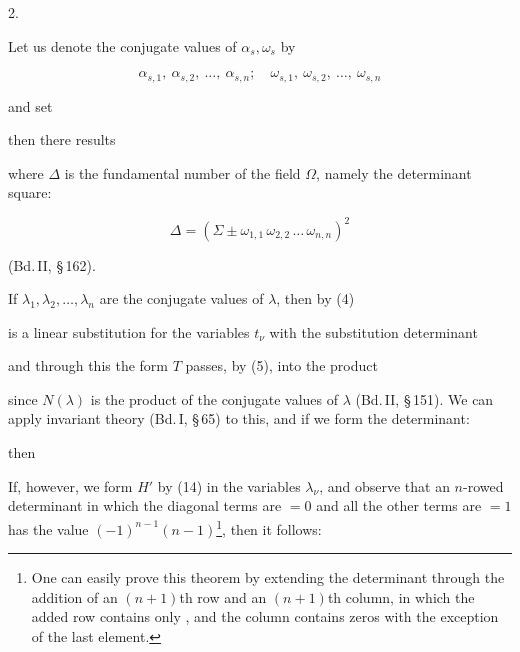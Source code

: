 2. 

Let us denote the conjugate values of $\alpha_s, \omega_s$ by

\[
\alpha_{s,1},\ \alpha_{s,2},\ \dots,\ \alpha_{s,n};\quad \omega_{s,1},\ \omega_{s,2},\ \dots,\ \omega_{s,n}
\]

and set


then there results


where $\varDelta$ is the fundamental number of the field $\Omega$, namely the determinant square:

\[
\varDelta = (\Sigma \pm \omega_{1,1}\,\omega_{2,2}\,\dots\,\omega_{n,n})^2
\]

(Bd.\,II, \S\,162).

If $\lambda_1, \lambda_2, \dots, \lambda_n$ are the conjugate values of $\lambda$, then by (4)


is a linear substitution for the variables $t_\nu$ with the substitution determinant


and through this the form $T$ passes, by (5), into the product


since $N(\lambda)$ is the product of the conjugate values of $\lambda$ (Bd.\,II, \S\,151). We can apply invariant theory (Bd.\,I, \S\,65) to this, and if we form the  determinant:


then


If, however, we form $H'$ by (14) in the variables $\lambda_\nu$, and observe that an $n$-rowed determinant in which the diagonal terms are $=0$ and all the other terms are $=1$ has the value $(-1)^{n-1}(n-1)$\footnote{One can easily prove this theorem by extending the determinant through the addition of an $(n+1)$th row and an $(n+1)$th column, in which the added row contains only , and the column contains zeros with the exception of the last element.}, then it follows:
